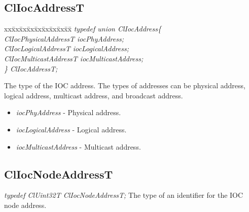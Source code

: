 \begin{flushleft}
 \subsection{ClIocAddressT}
 \begin{tabbing}
 xx\=xx\=xx\=xx\=xx\=xx\=xx\=xx\=xx\=\kill
 \textit{typedef union ClIocAddress\{}\\
 \>\>\>\>\textit{ClIocPhysicalAddressT iocPhyAddress;}\\
 \>\>\>\>\textit{ClIocLogicalAddressT iocLogicalAddress;}\\
 \>\>\>\>\textit{ClIocMulticastAddressT iocMulticastAddress;}\\
 \textit{\} ClIocAddressT;}\end{tabbing}
 The type of the IOC address. The types of addresses can be physical address, logical address,
 multicast address, and broadcast address. 
\begin{itemize}
\item
\textit{iocPhyAddress} - Physical address.

\item
\textit{iocLogicalAddress} - Logical address.

\item
\textit{iocMulticastAddress} - Multicast address.
\end{itemize}

\subsection{ClIocNodeAddressT}
\textit{typedef ClUint32T ClIocNodeAddressT;}
\newline
\newline
 The type of an identifier for the IOC node address.

    
    

\end{flushleft}
